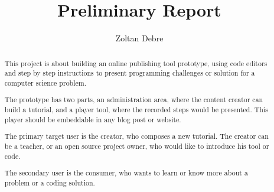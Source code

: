 \documentclass[11pt
              , a4paper
              , twoside
              , openright
              ]{report}
\title{Preliminary Report}
\author{Zoltan Debre}
\date{}
\begin{document}
\frontmatter



\begin{abstract}

This project is about building an online publishing tool prototype, using code editors and step by step instructions to present programming challenges or solution for a computer science problem.

The prototype has two parts, an administration area, where the content creator can build a tutorial, and a player tool, where the recorded steps would be presented. This player should be embeddable in any blog post or website.

The primary target user is the creator, who composes a new tutorial. The creator can be a teacher, or an open source project owner, who would like to introduce his tool or code.

The secondary user is the consumer, who wants to learn or know more about a problem or a coding solution.

\end{abstract}


\maketitle

%

\tableofcontents














\end{document}
